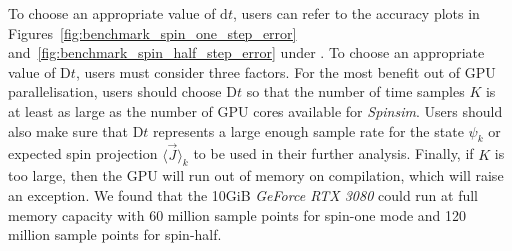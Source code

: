 \documentclass{jors}
\newcommand{\note}[1]{\textcolor{green}{\texttt{[NOTE: #1]}}}
\begin{document}
		To choose an appropriate value of $ \mathrm{d}t $, users can refer to the accuracy plots in Figures~\ref{fig:benchmark_spin_one_step_error} and~\ref{fig:benchmark_spin_half_step_error} under \emph{}. %
		To choose an appropriate value of $ \mathrm{D}t $, users must consider three factors.
		For the most benefit out of GPU parallelisation, users should choose $ \mathrm{D}t $ so that the number of time samples $ K $ is at least as large as the number of GPU cores available for \emph{Spinsim}.
		Users should also make sure that $ \mathrm{D}t $ represents a large enough sample rate for the state $ \psi_k $ or expected spin projection $ \langle \overrightarrow{J}\rangle_k $ to be used in their further analysis.
		Finally, if $ K $ is too large, then the GPU will run out of memory on compilation, which will raise an exception. %
		We found that the 10GiB \emph{GeForce RTX 3080} could run at full memory capacity with 60 million sample points for spin-one mode and 120 million sample points for spin-half.

\end{document}
